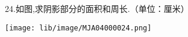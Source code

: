 24.如图,求阴影部分的面积和周长.（单位：厘米）

\begin{flushright}

    \texttt{[image: lib/image/MJA04000024.png]}

\end{flushright}



